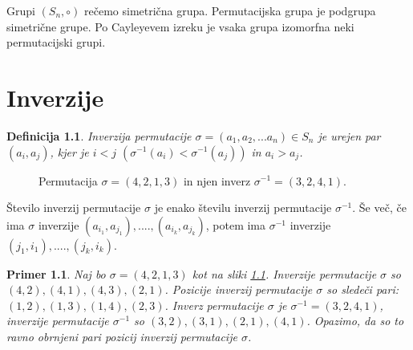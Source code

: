 \documentclass[a4paper, 12pt]{book}
\newtheorem{definicija}{Definicija}[chapter]
\newtheorem{primer}{Primer}[chapter]
\let\ab\allowbreak
\begin{document}
Grupi $(S_n, \circ)$ rečemo simetrična grupa. Permutacijska grupa je podgrupa simetrične grupe. Po Cayleyevem izreku je vsaka grupa izomorfna neki permutacijski grupi.


\chapter{ Inverzije }

\begin{definicija}
    Inverzija permutacije $\sigma = (a_1, a_2,... a_n) \in S_n$ je urejen par $(a_i, a_j)$, kjer je $i < j$ $(\sigma^{-1}(a_i) < \sigma^{-1}(a_j))$ in $a_i > a_j$.
\end{definicija}

\begin{figure}[h]
    \begin{center}
    \end{center}
    \caption{Permutacija $\sigma = (4, 2, 1, 3)$ in njen inverz $\sigma^{-1} = (3, 2, 4, 1)$.}
    \label{permutacija_4213}
\end{figure}

Število inverzij permutacije $\sigma$ je enako številu inverzij permutacije $\sigma^{-1}$. Še več, če ima $\sigma$ inverzije $(a_{i_1}, a_{j_1}), ...., (a_{i_k}, a_{j_k})$, potem ima $\sigma^{-1}$ inverzije $(j_1, i_1), ...., (j_k, i_k)$.

\begin{primer}
    Naj bo $\sigma = (4, 2, 1, 3)$ kot na sliki \ref{permutacija_4213}. Inverzije permutacije $\sigma$ so $(4, 2), (4, 1), (4, 3), (2, 1)$. Pozicije inverzij permutacije $\sigma$ so sledeči pari: $(1, 2), (1, 3), (1, 4), (2, 3)$. Inverz permutacije $\sigma$ je $\sigma^{-1} = (3, 2, 4, 1)$, inverzije permutacije $\sigma^{-1}$ so $(3, 2), \ab (3, 1), (2, 1), (4, 1)$. Opazimo, da so to ravno obrnjeni pari pozicij inverzij permutacije $\sigma$.
\end{primer}
\end{document}
